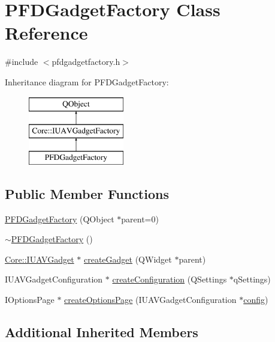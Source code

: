 \hypertarget{class_p_f_d_gadget_factory}{\section{P\-F\-D\-Gadget\-Factory Class Reference}
\label{class_p_f_d_gadget_factory}
}


{\ttfamily \#include $<$pfdgadgetfactory.\-h$>$}

Inheritance diagram for P\-F\-D\-Gadget\-Factory\-:\begin{figure}[H]
\begin{center}
\leavevmode
\includegraphics[height=3.000000cm]{class_p_f_d_gadget_factory}
\end{center}
\end{figure}
\subsection*{Public Member Functions}
\begin{DoxyCompactItemize}
\item 
\hyperlink{group___o_p_map_plugin_ga3c6dc1d198abb5039a6eae8378445ce8}{P\-F\-D\-Gadget\-Factory} (Q\-Object $\ast$parent=0)
\item 
\hyperlink{group___o_p_map_plugin_ga56df1b4bb10efeda677e12cab72651a1}{$\sim$\-P\-F\-D\-Gadget\-Factory} ()
\item 
\hyperlink{class_core_1_1_i_u_a_v_gadget}{Core\-::\-I\-U\-A\-V\-Gadget} $\ast$ \hyperlink{group___o_p_map_plugin_gaabdf0c7b16f184f5e8c2ca4dd1a8b6d0}{create\-Gadget} (Q\-Widget $\ast$parent)
\item 
I\-U\-A\-V\-Gadget\-Configuration $\ast$ \hyperlink{group___o_p_map_plugin_gab815256ffa03ff2447c6be5a1d56e1ab}{create\-Configuration} (Q\-Settings $\ast$q\-Settings)
\item 
I\-Options\-Page $\ast$ \hyperlink{group___o_p_map_plugin_ga74a3922aa2b3e3524dc1969c65f4bf07}{create\-Options\-Page} (I\-U\-A\-V\-Gadget\-Configuration $\ast$\hyperlink{deflate_8c_a4473b5227787415097004fd39f55185e}{config})
\end{DoxyCompactItemize}
\subsection*{Additional Inherited Members}


